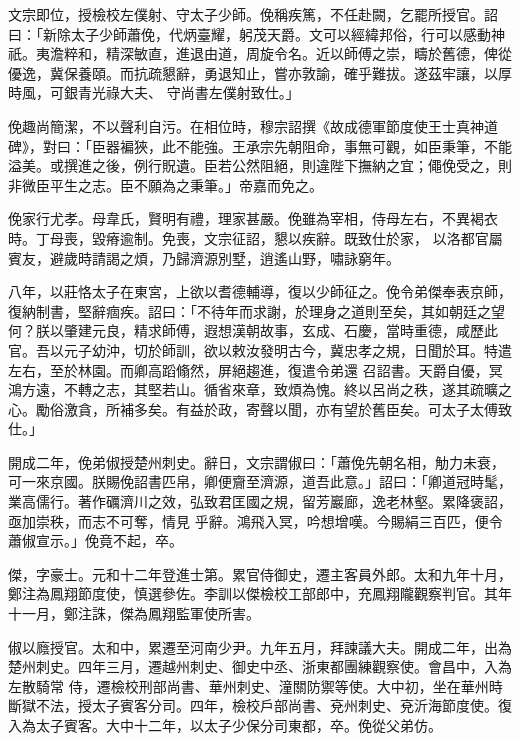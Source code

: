 \begin{pinyinscope}
 文宗即位，授檢校左僕射、守太子少師。俛稱疾篤，不任赴闕，乞罷所授官。詔曰：「新除太子少師蕭俛，代炳臺耀，躬茂天爵。文可以經緯邦俗，行可以感動神祇。夷澹粹和，精深敏直，進退由道，周旋令名。近以師傅之崇，疇於舊德，俾從優逸，冀保養頤。而抗疏懇辭，勇退知止，嘗亦敦諭，確乎難拔。遂茲牢讓，以厚時風，可銀青光祿大夫、
 守尚書左僕射致仕。」



 俛趣尚簡潔，不以聲利自污。在相位時，穆宗詔撰《故成德軍節度使王士真神道碑》，對曰：「臣器褊狹，此不能強。王承宗先朝阻命，事無可觀，如臣秉筆，不能溢美。或撰進之後，例行貺遺。臣若公然阻絕，則違陛下撫納之宜；僶俛受之，則非微臣平生之志。臣不願為之秉筆。」帝嘉而免之。



 俛家行尤孝。母韋氏，賢明有禮，理家甚嚴。俛雖為宰相，侍母左右，不異褐衣時。丁母喪，毀瘠逾制。免喪，文宗征詔，懇以疾辭。既致仕於家，
 以洛都官屬賓友，避歲時請謁之煩，乃歸濟源別墅，逍遙山野，嘯詠窮年。



 八年，以莊恪太子在東宮，上欲以耆德輔導，復以少師征之。俛令弟傑奉表京師，復納制書，堅辭痼疾。詔曰：「不待年而求謝，於理身之道則至矣，其如朝廷之望何？朕以肇建元良，精求師傅，遐想漢朝故事，玄成、石慶，當時重德，咸歷此官。吾以元子幼沖，切於師訓，欲以敕汝發明古今，冀忠孝之規，日聞於耳。特遣左右，至於林園。而卿高蹈翛然，屏絕趨進，復遣令弟還
 召詔書。天爵自優，冥鴻方遠，不轉之志，其堅若山。循省來章，致煩為愧。終以呂尚之秩，遂其疏曠之心。勵俗激貪，所補多矣。有益於政，寄聲以聞，亦有望於舊臣矣。可太子太傅致仕。」



 開成二年，俛弟俶授楚州刺史。辭日，文宗謂俶曰：「蕭俛先朝名相，觔力未衰，可一來京國。朕賜俛詔書匹帛，卿便齎至濟源，道吾此意。」詔曰：「卿道冠時髦，業高儒行。著作礪濟川之效，弘致君匡國之規，留芳巖廊，逸老林壑。累降褒詔，亟加崇秩，而志不可奪，情見
 乎辭。鴻飛入冥，吟想增嘆。今賜絹三百匹，便令蕭俶宣示。」俛竟不起，卒。



 傑，字豪士。元和十二年登進士第。累官侍御史，遷主客員外郎。太和九年十月，鄭注為鳳翔節度使，慎選參佐。李訓以傑檢校工部郎中，充鳳翔隴觀察判官。其年十一月，鄭注誅，傑為鳳翔監軍使所害。



 俶以廕授官。太和中，累遷至河南少尹。九年五月，拜諫議大夫。開成二年，出為楚州刺史。四年三月，遷越州刺史、御史中丞、浙東都團練觀察使。會昌中，入為左散騎常
 侍，遷檢校刑部尚書、華州刺史、潼關防禦等使。大中初，坐在華州時斷獄不法，授太子賓客分司。四年，檢校戶部尚書、兗州刺史、兗沂海節度使。復入為太子賓客。大中十二年，以太子少保分司東都，卒。俛從父弟仿。




\end{pinyinscope}
